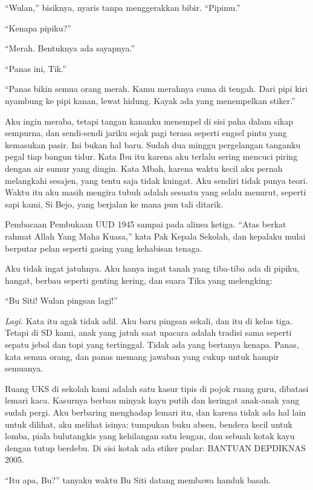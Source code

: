 \documentclass[11pt,twoside,openany]{book}
\makeatletter
\newcommand{\scenebreak}{\par\vspace{0.9em}{\centering\textsc{*\hspace{0.7em}*\hspace{0.7em}*}\par}\vspace{0.9em}\@afterindentfalse\@afterheading}
\makeatother
\begin{document}
``Wulan,'' bisiknya, nyaris tanpa menggerakkan bibir. ``Pipimu.''

``Kenapa pipiku?''

``Merah. Bentuknya ada sayapnya.''

``Panas ini, Tik.''

``Panas bikin semua orang merah. Kamu merahnya cuma di tengah. Dari pipi kiri nyambung ke pipi kanan, lewat hidung. Kayak ada yang menempelkan stiker.''

Aku ingin meraba, tetapi tangan kananku menempel di sisi paha dalam sikap sempurna, dan sendi-sendi jariku sejak pagi terasa seperti engsel pintu yang kemasukan pasir. Ini bukan hal baru. Sudah dua minggu pergelangan tanganku pegal tiap bangun tidur. Kata Ibu itu karena aku terlalu sering mencuci piring dengan air sumur yang dingin. Kata Mbah, karena waktu kecil aku pernah melangkahi sesajen, yang tentu saja tidak kuingat. Aku sendiri tidak punya teori. Waktu itu aku masih mengira tubuh adalah sesuatu yang selalu menurut, seperti sapi kami, Si Bejo, yang berjalan ke mana pun tali ditarik.

Pembacaan Pembukaan UUD 1945 sampai pada alinea ketiga. ``Atas berkat rahmat Allah Yang Maha Kuasa,'' kata Pak Kepala Sekolah, dan kepalaku mulai berputar pelan seperti gasing yang kehabisan tenaga.

Aku tidak ingat jatuhnya. Aku hanya ingat tanah yang tiba-tiba ada di pipiku, hangat, berbau seperti genting kering, dan suara Tika yang melengking:

``Bu Siti! Wulan pingsan lagi!''

\emph{Lagi.} Kata itu agak tidak adil. Aku baru pingsan sekali, dan itu di kelas tiga. Tetapi di SD kami, anak yang jatuh saat upacara adalah tradisi sama seperti sepatu jebol dan topi yang tertinggal. Tidak ada yang bertanya kenapa. Panas, kata semua orang, dan panas memang jawaban yang cukup untuk hampir semuanya.

\scenebreak
Ruang UKS di sekolah kami adalah satu kasur tipis di pojok ruang guru, dibatasi lemari kaca. Kasurnya berbau minyak kayu putih dan keringat anak-anak yang sudah pergi. Aku berbaring menghadap lemari itu, dan karena tidak ada hal lain untuk dilihat, aku melihat isinya: tumpukan buku absen, bendera kecil untuk lomba, piala bulutangkis yang kehilangan satu lengan, dan sebuah kotak kayu dengan tutup berdebu. Di sisi kotak ada stiker pudar: BANTUAN DEPDIKNAS 2005.

``Itu apa, Bu?'' tanyaku waktu Bu Siti datang membawa handuk basah.
\end{document}
